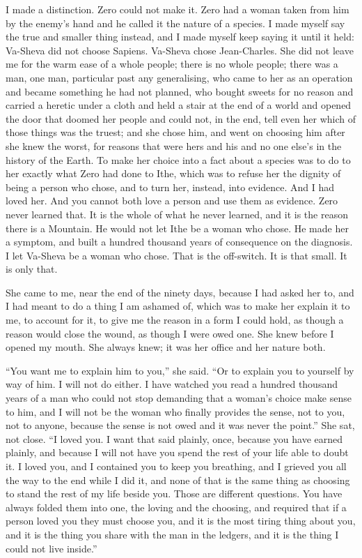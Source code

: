 I made a distinction. Zero could not make it. Zero had a woman taken from him by the enemy's hand and he called it the nature of a species. I made myself say the true and smaller thing instead, and I made myself keep saying it until it held: Va-Sheva did not choose Sapiens. Va-Sheva chose Jean-Charles. She did not leave me for the warm ease of a whole people; there is no whole people; there was a man, one man, particular past any generalising, who came to her as an operation and became something he had not planned, who bought sweets for no reason and carried a heretic under a cloth and held a stair at the end of a world and opened the door that doomed her people and could not, in the end, tell even her which of those things was the truest; and she chose him, and went on choosing him after she knew the worst, for reasons that were hers and his and no one else's in the history of the Earth. To make her choice into a fact about a species was to do to her exactly what Zero had done to Ithe, which was to refuse her the dignity of being a person who chose, and to turn her, instead, into evidence. And I had loved her. And you cannot both love a person and use them as evidence. Zero never learned that. It is the whole of what he never learned, and it is the reason there is a Mountain. He would not let Ithe be a woman who chose. He made her a symptom, and built a hundred thousand years of consequence on the diagnosis. I let Va-Sheva be a woman who chose. That is the off-switch. It is that small. It is only that.\par

\ornament

She came to me, near the end of the ninety days, because I had asked her to, and I had meant to do a thing I am ashamed of, which was to make her explain it to me, to account for it, to give me the reason in a form I could hold, as though a reason would close the wound, as though I were owed one. She knew before I opened my mouth. She always knew; it was her office and her nature both.\par

``You want me to explain him to you,'' she said. ``Or to explain you to yourself by way of him. I will not do either. I have watched you read a hundred thousand years of a man who could not stop demanding that a woman's choice make sense to him, and I will not be the woman who finally provides the sense, not to you, not to anyone, because the sense is not owed and it was never the point.'' She sat, not close. ``I loved you. I want that said plainly, once, because you have earned plainly, and because I will not have you spend the rest of your life able to doubt it. I loved you, and I contained you to keep you breathing, and I grieved you all the way to the end while I did it, and none of that is the same thing as choosing to stand the rest of my life beside you. Those are different questions. You have always folded them into one, the loving and the choosing, and required that if a person loved you they must choose you, and it is the most tiring thing about you, and it is the thing you share with the man in the ledgers, and it is the thing I could not live inside.''\par

